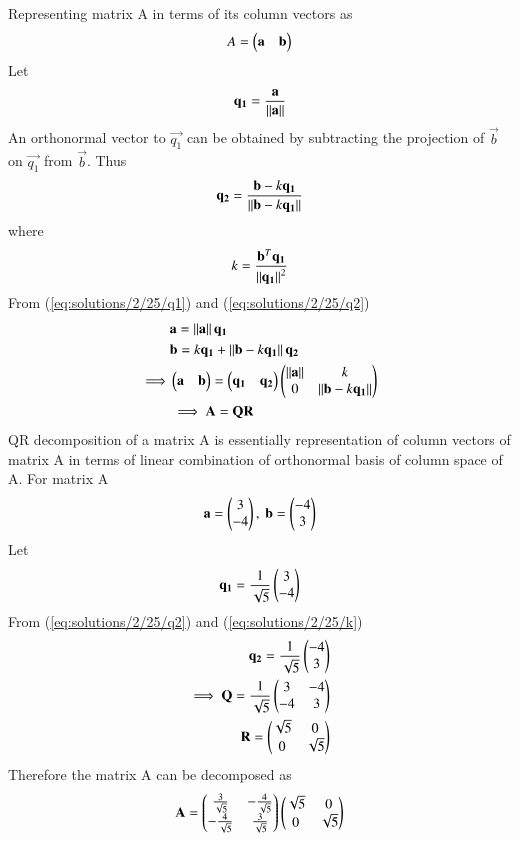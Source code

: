 Representing matrix A in terms of its column vectors as
\begin{align}
	A=\begin{pmatrix}\mathbf{a} & \mathbf{b}\end{pmatrix}
\end{align}
Let
\begin{align}
	\mathbf{q_1}=\frac{\mathbf{a}}{\left\lVert\mathbf{a}\right\rVert} \label{eq:solutions/2/25/q1} 
\end{align}
An orthonormal vector to $\vec{q_1}$ can be obtained by subtracting the projection of $\vec{b}$ on $\vec{q_1}$ from $\vec{b}$. Thus
\begin{align}
	\mathbf{q_2}=\frac{\mathbf{b}-k\mathbf{q_1}}{\left\lVert\mathbf{b}-k\mathbf{q_1}\right\rVert} \label{eq:solutions/2/25/q2}
\end{align}
where
\begin{align}
	k=\frac{\mathbf{b}^T\mathbf{q_1}}{\left\lVert\mathbf{q_1}\right\rVert^2} \label{eq:solutions/2/25/k}
\end{align}
From (\ref{eq:solutions/2/25/q1}) and (\ref{eq:solutions/2/25/q2})
\begin{align}
	&\mathbf{a}=\left\lVert\mathbf{a}\right\rVert\mathbf{q_1} \\
	&\mathbf{b}=k\mathbf{q_1} + \left\lVert\mathbf{b}-k\mathbf{q_1}\right\rVert\mathbf{q_2} \\
	\implies 
	&\begin{pmatrix}\mathbf{a} & \mathbf{b}\end{pmatrix}=\begin{pmatrix}\mathbf{q_1} & \mathbf{q_2}\end{pmatrix}
        \begin{pmatrix}\left\lVert\mathbf{a}\right\rVert & k \\ 0 & \left\lVert\mathbf{b}-k\mathbf{q_1}\right\rVert\end{pmatrix} \\
	&\implies \mathbf{A}=\mathbf{Q}\mathbf{R}
\end{align}
QR decomposition of a matrix A is essentially representation of column vectors of matrix A in terms of linear combination of orthonormal basis of column space of A.
For matrix A
\begin{align}
	\mathbf{a}=\begin{pmatrix}3\\-4\end{pmatrix}, \ \mathbf{b}=\begin{pmatrix}-4\\3\end{pmatrix} \\
\end{align}
Let
\begin{align}
	\mathbf{q_1}=\frac{1}{\sqrt{5}}\begin{pmatrix}3\\-4\end{pmatrix} \\
\end{align}
From (\ref{eq:solutions/2/25/q2}) and (\ref{eq:solutions/2/25/k})
\begin{align}
	\mathbf{q_2}=\frac{1}{\sqrt{5}}\begin{pmatrix}-4\\3\end{pmatrix}\\
	\implies 
	\mathbf{Q}=\frac{1}{\sqrt{5}}\begin{pmatrix}3 & -4 \\ -4 & 3\end{pmatrix} \\
	\mathbf{R}=\begin{pmatrix}\sqrt{5} & 0 \\ 0 & \sqrt{5}\end{pmatrix}
\end{align}
Therefore the matrix A can be decomposed as 
\begin{align}
	\mathbf{A}=
	\begin{pmatrix}\frac{3}{\sqrt{5}} & -\frac{4}{\sqrt{5}} \\
	      -\frac{4}{\sqrt{5}} & \frac{3}{\sqrt{5}} \end{pmatrix}
	\begin{pmatrix}\sqrt{5} & 0 \\ 0 & \sqrt{5}\end{pmatrix}
\end{align}
